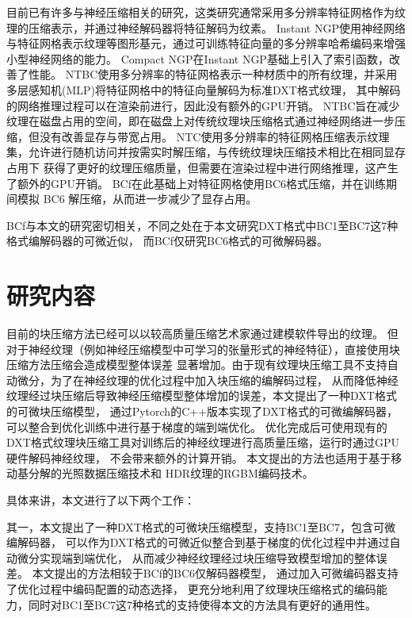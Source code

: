 目前已有许多与神经压缩相关的研究，这类研究通常采用多分辨率特征网格作为纹理的压缩表示，并通过神经解码器将特征解码为纹素。
Instant NGP\cite{muller2022instant}使用神经网络与特征网格表示纹理等图形基元，通过可训练特征向量的多分辨率哈希编码来增强小型神经网络的能力。
Compact NGP\cite{takikawa2023compact}在Instant NGP基础上引入了索引函数，改善了性能。
NTBC\cite{fujieda2024neural}使用多分辨率的特征网格表示一种材质中的所有纹理，并采用多层感知机(MLP)将特征网格中的特征向量解码为标准DXT格式纹理，
其中解码的网络推理过程可以在渲染前进行，因此没有额外的GPU开销。
NTBC旨在减少纹理在磁盘占用的空间，即在磁盘上对传统纹理块压缩格式通过神经网络进一步压缩，但没有改善显存与带宽占用。
NTC\cite{vaidyanathan2023random}使用多分辨率的特征网格压缩表示纹理集，允许进行随机访问并按需实时解压缩，与传统纹理块压缩技术相比在相同显存占用下
获得了更好的纹理压缩质量，但需要在渲染过程中进行网络推理，这产生了额外的GPU开销。
BCf\cite{weinreich2024real}在此基础上对特征网格使用BC6格式压缩，并在训练期间模拟 BC6 解压缩，从而进一步减少了显存占用。

BCf\cite{weinreich2024real}与本文的研究密切相关，不同之处在于本文研究DXT格式中BC1至BC7这7种格式编解码器的可微近似，
而BCf\cite{weinreich2024real}仅研究BC6格式的可微解码器。

\section{研究内容}

目前的块压缩方法已经可以以较高质量压缩艺术家通过建模软件导出的纹理。
但对于神经纹理（例如神经压缩模型中可学习的张量形式的神经特征），直接使用块压缩方法压缩会造成模型整体误差
显著增加。由于现有纹理块压缩工具不支持自动微分，为了在神经纹理的优化过程中加入块压缩的编解码过程，
从而降低神经纹理经过块压缩后导致神经压缩模型整体增加的误差，本文提出了一种DXT格式的可微块压缩模型，
通过Pytorch的C++版本实现了DXT格式的可微编解码器，可以整合到优化训练中进行基于梯度的端到端优化。
优化完成后可使用现有的DXT格式纹理块压缩工具对训练后的神经纹理进行高质量压缩，运行时通过GPU硬件解码神经纹理，
不会带来额外的计算开销。
本文提出的方法也适用于基于移动基分解的光照数据压缩技术\cite{silvennoinen2021moving}和
HDR纹理的RGBM编码技术。

具体来讲，本文进行了以下两个工作：

其一，本文提出了一种DXT格式的可微块压缩模型，支持BC1至BC7，包含可微编解码器，
可以作为DXT格式的可微近似整合到基于梯度的优化过程中并通过自动微分实现端到端优化，
从而减少神经纹理经过块压缩导致模型增加的整体误差。
本文提出的方法相较于BCf\cite{weinreich2024real}的BC6仅解码器模型，
通过加入可微编码器支持了优化过程中编码配置的动态选择，
更充分地利用了纹理块压缩格式的编码能力，同时对BC1至BC7这7种格式的支持使得本文的方法具有更好的通用性。


